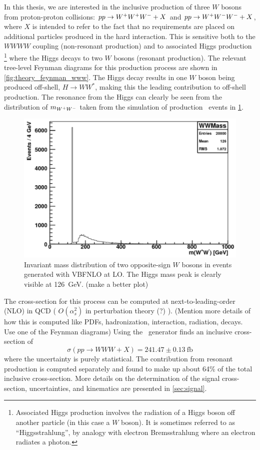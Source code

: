 In this thesis, we are interested in the inclusive production of three
$W$ bosons from proton-proton collisions:
$pp\rightarrow\- W^{+}W^{+}W^{-}+X$ and $pp\rightarrow W^{+}W^{-}W^{-}\allowbreak +X$, 
where $X$ is intended to refer to the fact that no requirements are 
placed on additional particles produced in the hard interaction.
This is sensitive both
to the $WWWW$ coupling (non-resonant production) 
and to associated Higgs production \footnote{Associated Higgs production involves
the radiation of a Higgs boson off another particle (in this case a $W$ boson). It 
is sometimes referred to as ``Higgsstrahlung'', by analogy 
with electron Bremsstrahlung where an electron radiates a photon.} where 
the Higgs decays to two
$W$ bosons (resonant production). 
The relevant
tree-level Feynman diagrams for this production process are shown in 
\fig\ref{fig:theory_feynman_www}.
The Higgs decay results in one $W$ boson being produced off-shell,
$H\rightarrow WW^*$, making this the leading contribution to off-shell
production.  
The resonance from the Higgs can clearly be seen from the 
distribution of $m_{W^{+}W^{-}}$ taken from the simulation of production \www~events
in \fig\ref{fig:mww_higgs}.

\begin{figure}[ht]
\centering
\includegraphics[width=0.5\columnwidth]{figures/2l2j/mWW-parton.pdf}
\caption{ Invariant mass distribution of two opposite-sign $W$ bosons 
in \www events generated with VBFNLO at LO. The Higgs mass peak is clearly 
visible at 126~GeV. (make a better plot)}
\label{fig:mww_higgs}
\end{figure}




The cross-section for this process can be computed at 
next-to-leading-order (NLO) in QCD
( $O(\alpha_s^2)$ in perturbation theory (?) ). 
(Mention more details of how this is computed like PDFs,
hadronization, interaction, radiation, decays. Use one of the 
Feynman diagrams)
Using 
the \madgraph~generator finds an inclusive cross-section of 
\begin{equation}
\sigma(pp\rightarrow WWW + X) = 241.47 \pm 0.13~\textrm{fb}
\label{eq:www_total_xsec}
\end{equation}
where the uncertainty is purely statistical.
The contribution from resonant production is computed separately
and found to make up about 64\% of the 
total inclusive cross-section.
More details on the determination of the signal cross-section, uncertainties,
and kinematics are presented in \sec\ref{sec:signal}.

